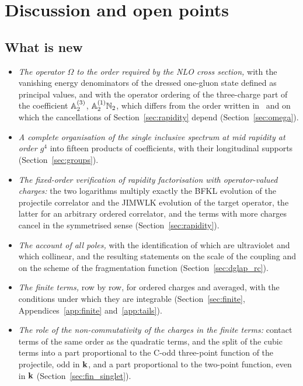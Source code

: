 \section{Discussion and open points}\label{sec:discussion}

\subsection{What is new}\label{sec:disc_new}

\begin{itemize}
\item \emph{The operator $\Omega$ to the order required by the NLO cross section,} with the vanishing energy denominators of the dressed one-gluon state defined as principal values, and with the operator ordering of the three-charge part of the coefficient $\mathbb{A}^{(3)}_2$, $\mathbb{A}^{(1)}_2\mathbb{N}_2$, which differs from the order written in~\cite{Lublinsky:2016meo} and on which the cancellations of Section~\ref{sec:rapidity} depend (Section~\ref{sec:omega}).
\item \emph{A complete organisation of the single inclusive spectrum at mid rapidity at order $g^4$} into fifteen products of coefficients, with their longitudinal supports (Section~\ref{sec:groups}).
\item \emph{The fixed-order verification of rapidity factorisation with operator-valued charges:} the two logarithms multiply exactly the BFKL evolution of the projectile correlator and the JIMWLK evolution of the target operator, the latter for an arbitrary ordered correlator, and the terms with more charges cancel in the symmetrised sense (Section~\ref{sec:rapidity}).
\item \emph{The account of all poles,} with the identification of which are ultraviolet and which collinear, and the resulting statements on the scale of the coupling and on the scheme of the fragmentation function (Section~\ref{sec:dglap_rc}).
\item \emph{The finite terms,} row by row, for ordered charges and averaged, with the conditions under which they are integrable (Section~\ref{sec:finite}, Appendices~\ref{app:finite} and~\ref{app:tails}).
\item \emph{The role of the non-commutativity of the charges in the finite terms:} contact terms of the same order as the quadratic terms, and the split of the cubic terms into a part proportional to the C-odd three-point function of the projectile, odd in $\mathbf{k}$, and a part proportional to the two-point function, even in $\mathbf{k}$ (Section~\ref{sec:fin_singlet}).
\end{itemize}

